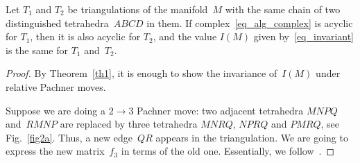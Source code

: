 \begin{theorem}
Let $T_1$ and $T_2$ be triangulations of the manifold~$M$ with the same chain of two distinguished tetrahedra~$ABCD$ in them. If complex~\eqref{eq_alg_complex} is acyclic for $T_1$, then it is also acyclic for $T_2$, and the value $I(M)$ given by~\eqref{eq_invariant} is the same for $T_1$ and~$T_2$.
\label{th3}
\end{theorem}

\begin{proof}
By Theorem~\ref{th1}, it is enough to show the invariance of~$I(M)$ under relative Pachner moves.

Suppose we are doing a $2\to 3$ Pachner move: two adjacent tetrahedra $MNPQ$ and~$RMNP$ are replaced by three tetrahedra $MNRQ$, $NPRQ$
and $PMRQ$, see Fig.~\ref{fig2a}. Thus, a new edge~$QR$ appears in the triangulation. We are going to express the new matrix~$f_3$ in terms of the old one. Essentially, we follow~\cite[Section~4]{JNMP1}.


\end{proof}
